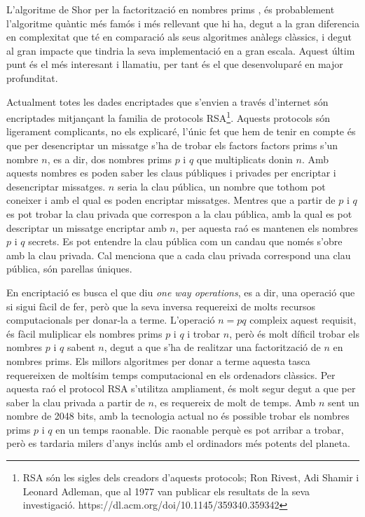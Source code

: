 L'algoritme de Shor per la factorització en nombres prims \cite{Shor_97}, és probablement l'algoritme quàntic més famós i més rellevant que hi ha, degut a la gran diferencia en complexitat que té en comparació als seus algoritmes anàlegs clàssics, i degut al gran impacte que tindria la seva implementació en a gran escala. Aquest últim punt és el més interesant i llamatiu, per tant és el que desenvoluparé en major profunditat. 

Actualment totes les dades encriptades que s'envien a través d'internet són encriptades mitjançant la familia de protocols RSA\footnote{RSA són les sigles dels creadors d'aquests protocols; Ron Rivest, Adi Shamir i Leonard Adleman, que al 1977 van publicar els resultats de la seva investigació.  https://dl.acm.org/doi/10.1145/359340.359342}. Aquests protocols són ligerament complicants, no els explicaré, l'únic fet que hem de tenir en compte és que per desencriptar un missatge s'ha de trobar els factors factors prims s'un nombre $n$, es a dir, dos nombres prims $p$ i $q$ que multiplicats donin $n$. Amb aquests nombres es poden saber les claus públiques i privades per encriptar i desencriptar missatges. $n$ seria la clau pública, un nombre que tothom pot coneixer i amb el qual es poden encriptar missatges. Mentres que a partir de $p$ i $q$ es pot trobar la clau privada que correspon a la clau pública, amb la qual es pot descriptar un missatge encriptar amb $n$, per aquesta raó es mantenen els nombres $p$ i $q$ secrets. Es pot entendre la clau pública com un candau que només s'obre amb la clau privada. Cal menciona que a cada clau privada correspond una clau pública, són parellas úniques.   

En encriptació es busca el que diu \textit{one way operations}, es a dir, una operació que si sigui fàcil de fer, però que la seva inversa requereixi de molts recursos computacionals per donar-la a terme. L'operació $n = pq$ compleix aquest requisit, és fàcil muliplicar els nombres prims $p$ i $q$ i trobar $n$, però és molt díficil trobar els nombres $p$ i $q$ sabent $n$, degut a que s'ha de realitzar una factorització de $n$ en nombres prims. Els millors algoritmes per donar a terme aquesta tasca requereixen de moltísim temps computacional en els ordenadors clàssics. Per aquesta raó el protocol RSA s'utilitza ampliament, és molt segur degut a que per saber la clau privada a partir de $n$, es requereix de molt de temps. Amb $n$ sent un nombre de 2048 bits, amb la tecnologia actual no és possible trobar els nombres prims $p$ i $q$ en un temps raonable. Dic raonable perquè es pot arribar a trobar, però es tardaria milers d'anys inclús amb el ordinadors més potents del planeta.

